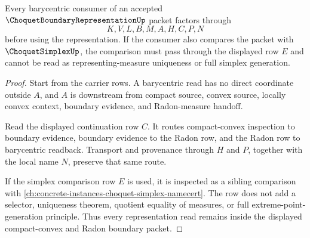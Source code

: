\begin{theorem}
\label{thm:choquet-boundary-representation-barycentric-route}
Every barycentric consumer of an accepted $\ChoquetBoundaryRepresentationUp$ packet factors through
$$
K,V,L,B,M,A,H,C,P,N
$$
before using the representation. If the consumer also compares the packet with $\ChoquetSimplexUp$, the comparison must pass through the displayed row $E$ and cannot be read as representing-measure uniqueness or full simplex generation.
\end{theorem}
\begin{proof}
Start from the carrier rows. A barycentric read has no direct coordinate outside $A$, and $A$ is downstream from compact source, convex source, locally convex context, boundary evidence, and Radon-measure handoff.

Read the displayed continuation row $C$. It routes compact-convex inspection to boundary evidence, boundary evidence to the Radon row, and the Radon row to barycentric readback. Transport and provenance through $H$ and $P$, together with the local name $N$, preserve that same route.

If the simplex comparison row $E$ is used, it is inspected as a sibling comparison with \autoref{ch:concrete-instances-choquet-simplex-namecert}. The row does not add a selector, uniqueness theorem, quotient equality of measures, or full extreme-point-generation principle. Thus every representation read remains inside the displayed compact-convex and Radon boundary packet.
\end{proof}




